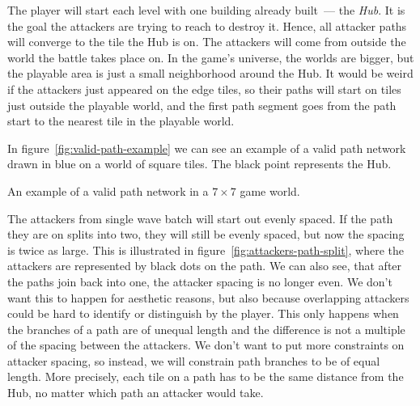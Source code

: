 The player will start each level with one building already built~--- the \emph{Hub}.
It is the goal the attackers are trying to reach to destroy it.
Hence, all attacker paths will converge to the tile the Hub is on.
The attackers will come from outside the world the battle takes place on.
In the game's universe, the worlds are bigger, but the playable area is just a small neighborhood around the Hub.
It would be weird if the attackers just appeared on the edge tiles, so their paths will start on tiles just outside the playable world, and the first path segment goes from the path start to the nearest tile in the playable world.

In figure~\ref{fig:valid-path-example} we can see an example of a valid path network drawn in blue on a world of square tiles.
The black point represents the Hub.

\begin{center}
    \captionsetup{type=figure}
    \caption{An example of a valid path network in a $7 \times 7$ game world.}
    \label{fig:valid-path-example}
\end{center}

The attackers from single wave batch will start out evenly spaced.
If the path they are on splits into two, they will still be evenly spaced, but now the spacing is twice as large.
This is illustrated in figure~\ref{fig:attackers-path-split}, where the attackers are represented by black dots on the path.
We can also see, that after the paths join back into one, the attacker spacing is no longer even.
We don't want this to happen for aesthetic reasons, but also because overlapping attackers could be hard to identify or distinguish by the player.
This only happens when the branches of a path are of unequal length and the difference is not a multiple of the spacing between the attackers.
We don't want to put more constraints on attacker spacing, so instead, we will constrain path branches to be of equal length.
More precisely, each tile on a path has to be the same distance from the Hub, no matter which path an attacker would take.

